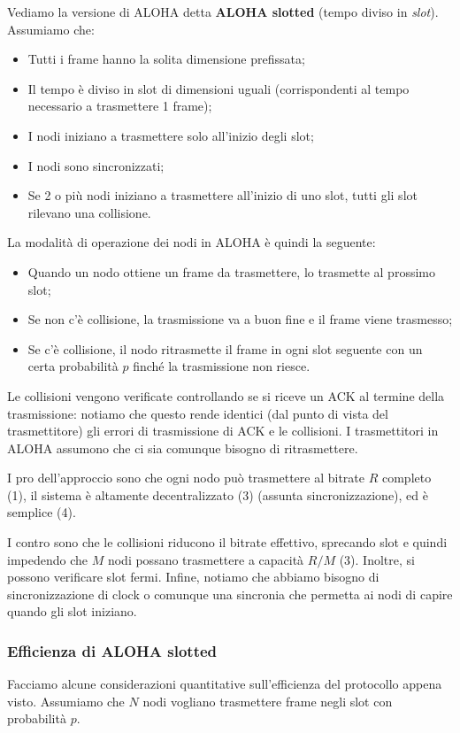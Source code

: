 \documentclass[a4paper,11pt]{article}
\begin{document}
Vediamo la versione di ALOHA detta \textbf{ALOHA slotted} (tempo diviso in \textit{slot}).
Assumiamo che:
\begin{itemize}
	\item Tutti i frame hanno la solita dimensione prefissata;
	\item Il tempo è diviso in slot di dimensioni uguali (corrispondenti al tempo necessario a trasmettere 1 frame);
	\item I nodi iniziano a trasmettere solo all'inizio degli slot;
	\item I nodi sono sincronizzati;
	\item Se 2 o più nodi iniziano a trasmettere all'inizio di uno slot, tutti gli slot rilevano una collisione.
\end{itemize}

La modalità di operazione dei nodi in ALOHA è quindi la seguente:
\begin{itemize}
	\item Quando un nodo ottiene un frame da trasmettere, lo trasmette al prossimo slot;
	\item Se non c'è collisione, la trasmissione va a buon fine e il frame viene trasmesso;
	\item Se c'è collisione, il nodo ritrasmette il frame in ogni slot seguente con un certa probabilità $p$ finché la trasmissione non riesce.
\end{itemize}

Le collisioni vengono verificate controllando se si riceve un ACK al termine della trasmissione: notiamo che questo rende identici (dal punto di vista del trasmettitore) gli errori di trasmissione di ACK e le collisioni. I trasmettitori in ALOHA assumono che ci sia comunque bisogno di ritrasmettere.

I pro dell'approccio sono che ogni nodo può trasmettere al bitrate $R$ completo (1), il sistema è altamente decentralizzato (3) (assunta sincronizzazione), ed è semplice (4).

I contro sono che le collisioni riducono il bitrate effettivo, sprecando slot e quindi impedendo che $M$ nodi possano trasmettere a capacità $R/M$ (3). Inoltre, si possono verificare slot fermi. Infine, notiamo che abbiamo bisogno di sincronizzazione di clock o comunque una sincronia che permetta ai nodi di capire quando gli slot iniziano.

\subsubsection{Efficienza di ALOHA slotted}
Facciamo alcune considerazioni quantitative sull'efficienza del protocollo appena visto.
Assumiamo che $N$ nodi vogliano trasmettere frame negli slot con probabilità $p$.
\end{document}
